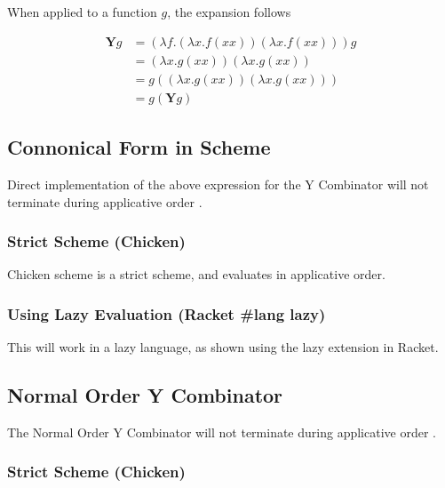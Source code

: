         When applied to a function $g$, the expansion follows \cite{WikiY}

        \begin{equation}
        \begin{aligned}
        \mathbf{Y}g 
        & = \left( \lambda f .  \left( \lambda x . f \left( x x \right) \right) \left( \lambda x . f \left( x x \right) \right) \right) g \\
        & = \left( \lambda x . g \left( x x \right) \right) \left( \lambda x . g \left( x x \right) \right) \\
        & = g \left( \left( \lambda x . g \left( x x \right) \right) \left( \lambda x . g \left( x x \right) \right) \right) \\
        & = g \left( \mathbf{Y} g \right)
        \end{aligned}
        \label{eq:y_combinator_expanded}
        \end{equation}

    \subsection{Connonical Form in Scheme}
      Direct implementation of the above expression for the Y Combinator will not terminate during applicative order \cite{Mvanier}.
      \subsubsection{Strict Scheme (Chicken)}
        Chicken scheme is a strict scheme, and evaluates in applicative order.
      \subsubsection{Using Lazy Evaluation (Racket \#lang lazy)}
        This will work in a lazy language, as shown using the lazy extension in Racket.


  \subsection{Normal Order Y Combinator}
    The Normal Order Y Combinator will not terminate during applicative order \cite{Mvanier}.
    \subsubsection{Strict Scheme (Chicken)}
